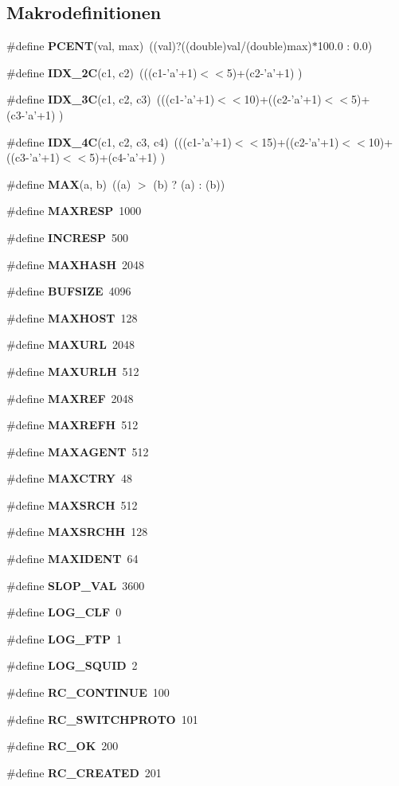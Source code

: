 \subsection*{Makrodefinitionen}
\begin{CompactItemize}
\item 
\#define {\bf PCENT}(val, max)~((val)?((double)val/(double)max)$\ast$100.0 : 0.0)
\item 
\#define {\bf IDX\_\-2C}(c1, c2)~(((c1-'a'+1)$<$$<$5)+(c2-'a'+1) )
\item 
\#define {\bf IDX\_\-3C}(c1, c2, c3)~(((c1-'a'+1)$<$$<$10)+((c2-'a'+1)$<$$<$5)+(c3-'a'+1) )
\item 
\#define {\bf IDX\_\-4C}(c1, c2, c3, c4)~(((c1-'a'+1)$<$$<$15)+((c2-'a'+1)$<$$<$10)+((c3-'a'+1)$<$$<$5)+(c4-'a'+1) )
\item 
\#define {\bf MAX}(a, b)~((a) $>$ (b) ? (a) : (b))
\item 
\#define {\bf MAXRESP}~1000
\item 
\#define {\bf INCRESP}~500
\item 
\#define {\bf MAXHASH}~2048
\item 
\#define {\bf BUFSIZE}~4096
\item 
\#define {\bf MAXHOST}~128
\item 
\#define {\bf MAXURL}~2048
\item 
\#define {\bf MAXURLH}~512
\item 
\#define {\bf MAXREF}~2048
\item 
\#define {\bf MAXREFH}~512
\item 
\#define {\bf MAXAGENT}~512
\item 
\#define {\bf MAXCTRY}~48
\item 
\#define {\bf MAXSRCH}~512
\item 
\#define {\bf MAXSRCHH}~128
\item 
\#define {\bf MAXIDENT}~64
\item 
\#define {\bf SLOP\_\-VAL}~3600
\item 
\#define {\bf LOG\_\-CLF}~0
\item 
\#define {\bf LOG\_\-FTP}~1
\item 
\#define {\bf LOG\_\-SQUID}~2
\item 
\#define {\bf RC\_\-CONTINUE}~100
\item 
\#define {\bf RC\_\-SWITCHPROTO}~101
\item 
\#define {\bf RC\_\-OK}~200
\item 
\#define {\bf RC\_\-CREATED}~201
\item 

\end{CompactItemize}
